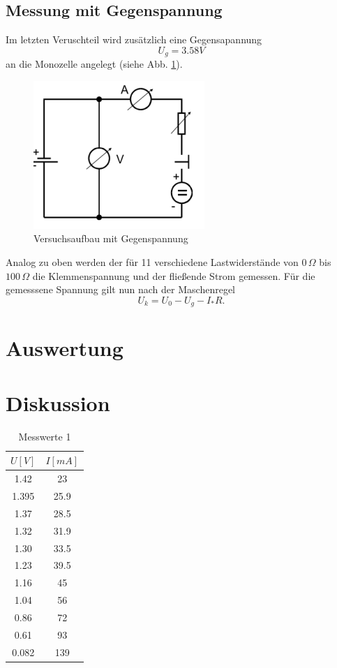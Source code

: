 \documentclass[11pt]{article}
\begin{document}
\subsection{Messung mit Gegenspannung}
Im letzten Veruschteil wird zus\"atzlich eine Gegensapannung 
\[
U_g = 3.58 V 
\] an die Monozelle angelegt (siehe Abb. \ref{Aufbau2}). 
\begin{figure}[htp]
\centering
\includegraphics[scale=1.00]{abb2.png}
\caption{Versuchsaufbau mit Gegenspannung}
\label{Aufbau2}
\end{figure}Analog zu oben werden der f\"ur 11 verschiedene Lastwiderst\"ande von $0\,\Omega$ bis $100\,\Omega$ die Klemmenspannung und der flie\ss ende Strom gemessen. F\"ur die gemesssene Spannung gilt nun nach der Maschenregel
\begin{equation}
U_k = U_0 - U_g - I_*R.
\end{equation}
\section{Auswertung}

\section{Diskussion}
\begin{table}[H]
 \centering
 \caption{Messwerte 1}
 \begin{tabular}{|c|c|}
  \hline
  $U[V]$ & $I[mA]$  \\
  \hline
  1.42 & 23 \\
  1.395 & 25.9 \\
  1.37& 28.5 \\
  1.32 & 31.9 \\
  1.30 & 33.5\\
  1.23 & 39.5\\
  1.16 & 45 \\
  1.04 & 56\\
  0.86 & 72\\
  0.61 & 93\\
  0.082 & 139\\
  \hline
 \end{tabular}
 \label{Messung 1}
 \end{table}
 
\end{document}
